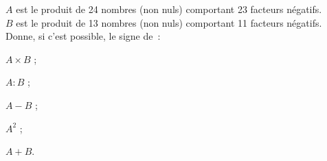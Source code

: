 \begin{exercice}[Signe]
$A$ est le produit de 24 nombres (non nuls) comportant 23 facteurs négatifs.\\[0.5em]
$B$ est le produit de 13 nombres (non nuls) comportant 11 facteurs négatifs.\\[0.5em] 
Donne, si c'est possible, le signe de :
\begin{colenumerate}{3}
 \item $A \times B$ ;
 \item $A : B$ ;
 \item $A - B$ ; 
 \item $A^{2}$ ;
 \item $A + B$.
 \end{colenumerate}           
\end{exercice}




